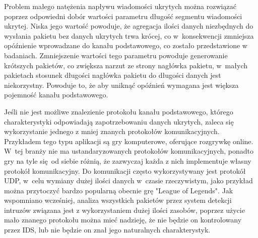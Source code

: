 \documentclass[a4paper, twoside, 12pt]{report}
\begin{document}
       Problem małego natężenia napływu wiadomości ukrytych można rozwiązać poprzez
       odpowiedni dobór wartości parametru długość segmentu wiadomości ukrytej.
       Niska jego wartość powoduje, że agregacja ilości danych niezbędnych do
       wysłania pakietu bez danych ukrytych trwa krócej, co w~konsekwencji zmniejsza
       opóźnienie wprowadzane do kanału podstawowego, co zostało przedstawione w
       badaniach. Zmniejszenie wartości tego parametru powoduje generowanie
       krótszych pakietów, co zwiększa narzut ze strony nagłówka pakietu, w~małych
       pakietach stosunek długości nagłówka pakietu do długości danych jest niekorzystny.
       Powoduje to, że aby uniknąć opóźnień wymagana jest większa pojemność kanału
       podstawowego.

       Jeśli nie jest możliwe znalezienie protokołu kanału podstawowego, którego
       charakterystyki odpowiadają zapotrzebowaniu danych ukrytych, zaleca się
       wykorzystanie jednego z mniej znanych protokołów komunikacyjnych. Przykładem
       tego typu aplikacji są gry komputerowe, oferujące rozgrywkę online. W~tej
       branży nie ma ustandaryzowanych protokołów komunikacyjnych, ponadto gry na
       tyle się od siebie różnią, że zazwyczaj każda z nich implementuje własny
       protokół komunikacyjny. Do komunikacji często wykorzystywany jest protokół
       UDP, w~celu wymiany dużej ilości danych w~czasie rzeczywistym, jako przykład
       można przytoczyć bardzo popularną obecnie grę "League of Legends". Jak wspomniano
       wcześniej, analiza wszystkich pakietów przez system detekcji intruzów
       związana jest z wykorzystaniem dużej ilości zasobów, poprzez użycie mało
       znanego protokołu można mieć nadzieję, że nie będzie on kontrolowany
       przez IDS, lub nie będzie on znał jego naturalnych charakterystyk.
\end{document}
